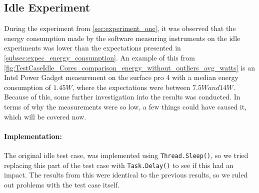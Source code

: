 \subsection{Idle Experiment}

During the experiment from \cref{sec:experiment_one}, it was observed that the energy consumption made by the software measuring instruments on the idle experiments was lower than the expectations presented in \cref{subsec:expec_energy_consumption}. An example of this from \cref*{fig:TestCaseIdle_Cores_comparison_energy_without_outliers_avg_watts} is an Intel Power Gadget measurement on the surface pro 4 with a median energy consumption of $1.45W$, where the expectations were between $7.5W and 14W$. Because of this, some further investigation into the results was conducted. In terms of why the measurements were so low, a few things could have caused it, which will be covered now.



\paragraph{Implementation:} The original idle test case, was implemented using \texttt{Thread.Sleep()}, so we tried replacing this part of the test case with \texttt{Task.Delay()} to see if this had an impact. The results from this were identical to the previous results, so we ruled out problems with the test case itself.

